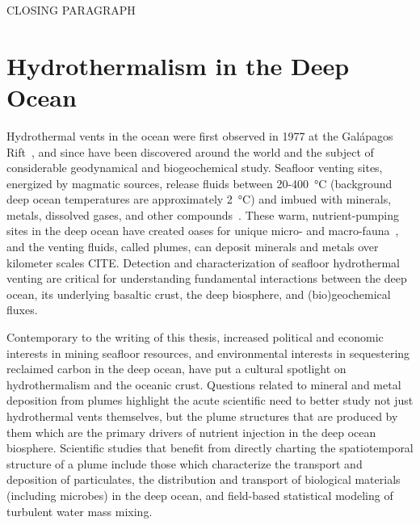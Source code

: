 CLOSING PARAGRAPH




\section{Hydrothermalism in the Deep Ocean}
\label{sec:charting-plumes}
Hydrothermal vents in the ocean were first observed in 1977 at the Galápagos Rift~\autocite{corliss1979submarine}, and since have been discovered around the world and the subject of considerable geodynamical and biogeochemical study.
Seafloor venting sites, energized by magmatic sources, release fluids between 20-\SI{400}{\celsius} (background deep ocean temperatures are approximately \SI{2}{\celsius}) and imbued with minerals, metals, dissolved gases, and other compounds~\autocite{jannasch1985geomicrobiology, martin2008hydrothermal}.
These warm, nutrient-pumping sites in the deep ocean have created oases for unique micro- and macro-fauna~\autocite{corliss1979submarine}, and the venting fluids, called plumes, can deposit minerals and metals over kilometer scales CITE.
Detection and characterization of seafloor hydrothermal venting are critical for  understanding fundamental interactions between the deep ocean, its underlying basaltic crust, the deep biosphere, and (bio)geochemical fluxes.

Contemporary to the writing of this thesis, increased political and economic interests in mining seafloor resources, and environmental interests in sequestering reclaimed carbon in the deep ocean, have put a cultural spotlight on hydrothermalism and the oceanic crust.
Questions related to mineral and metal deposition from plumes highlight the acute scientific need to better study not just hydrothermal vents themselves, but the plume structures that are produced by them which are the primary drivers of nutrient injection in the deep ocean biosphere.
Scientific studies that benefit from directly charting the spatiotemporal structure of a plume include those which characterize the transport and deposition of particulates, the distribution and transport of biological materials (including microbes) in the deep ocean, and field-based statistical modeling of turbulent water mass mixing.

